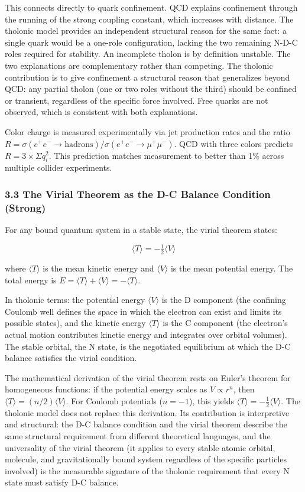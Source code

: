 \documentclass[
  11pt,
  letterpaper,
]{article}
\begin{document}
This connects directly to quark confinement. QCD explains confinement
through the running of the strong coupling constant, which increases
with distance. The tholonic model provides an independent structural
reason for the same fact: a single quark would be a one-role
configuration, lacking the two remaining N-D-C roles required for
stability. An incomplete tholon is by definition unstable. The two
explanations are complementary rather than competing. The tholonic
contribution is to give confinement a structural reason that generalizes
beyond QCD: any partial tholon (one or two roles without the third)
should be confined or transient, regardless of the specific force
involved. Free quarks are not observed, which is consistent with both
explanations.

Color charge is measured experimentally via jet production rates and the
ratio
\(R = \sigma(e^+e^- \to \text{hadrons}) / \sigma(e^+e^- \to \mu^+\mu^-)\).
QCD with three colors predicts \(R = 3 \times \Sigma q_i^2\). This
prediction matches measurement to better than 1\% across multiple
collider experiments.

\subsubsection{3.3 The Virial Theorem as the D-C Balance Condition
(Strong)}\label{the-virial-theorem-as-the-d-c-balance-condition-strong}

For any bound quantum system in a stable state, the virial theorem
states:

\[\langle T \rangle = -\tfrac{1}{2}\langle V \rangle\]

where \(\langle T \rangle\) is the mean kinetic energy and
\(\langle V \rangle\) is the mean potential energy. The total energy is
\(E = \langle T \rangle + \langle V \rangle = -\langle T \rangle\).

In tholonic terms: the potential energy \(\langle V \rangle\) is the D
component (the confining Coulomb well defines the space in which the
electron can exist and limits its possible states), and the kinetic
energy \(\langle T \rangle\) is the C component (the electron's actual
motion contributes kinetic energy and integrates over orbital volumes).
The stable orbital, the N state, is the negotiated equilibrium at which
the D-C balance satisfies the virial condition.

The mathematical derivation of the virial theorem rests on Euler's
theorem for homogeneous functions: if the potential energy scales as
\(V \propto r^n\), then \(\langle T \rangle = (n/2)\langle V \rangle\).
For Coulomb potentials (\(n = -1\)), this yields
\(\langle T \rangle = -\tfrac{1}{2}\langle V \rangle\). The tholonic
model does not replace this derivation. Its contribution is interpretive
and structural: the D-C balance condition and the virial theorem
describe the same structural requirement from different theoretical
languages, and the universality of the virial theorem (it applies to
every stable atomic orbital, molecule, and gravitationally bound system
regardless of the specific particles involved) is the measurable
signature of the tholonic requirement that every N state must satisfy
D-C balance.
\end{document}
